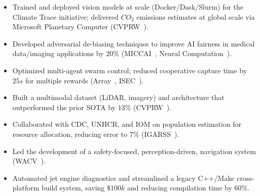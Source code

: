 \documentclass[11pt,a4paper,sans]{moderncv} %
\begin{document}

{
\begin{itemize} 
	\item Trained and deployed vision models at scale (Docker/Dask/Slurm) for the Climate Trace initiative; delivered $CO_2$ emissions estimates at global scale via Microsoft Planetary Computer (CVPRW~\cite{mukherjee2021towards}).
	\item Developed adversarial de-biasing techniques to improve AI fairness in medical data/imaging applications by $20\%$ (MICCAI~\cite{yuan2023edgemixup}, Neural Computation~\cite{paul2022tara}).
	\item Optimized multi-agent swarm control; reduced cooperative capture time by $25s$ for multiple rewards (Array~\cite{hadzic2022100218}, ISEC~\cite{buckley2021interdisciplinary}).
\end{itemize}
}


{
\begin{itemize}
	\item Built a multimodal dataset (LiDAR, imagery) and architecture that outperformed the prior SOTA by $13\%$ (CVPRW~\cite{RasterNetpaper}).
	\item Collaborated with CDC, UNHCR, and IOM on population estimation for resource allocation, reducing error to $7\%$ (IGARSS~\cite{DCApaper}).
  \item Led the development of a safety-focused, perception-driven, navigation system (WACV~\cite{WACVpaper}).
\end{itemize}
}


{
\begin{itemize}
	\item Automated jet engine diagnostics and streamlined a legacy C++/Make cross-platform build system, saving $\$100k$ and reducing compilation time by $60\%$.
\end{itemize}
}

\end{document}
